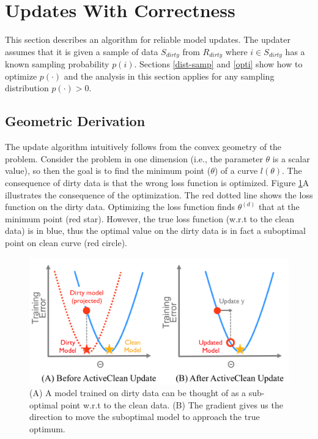 \section{Updates With Correctness}\label{model-update}
This section describes an algorithm for reliable model updates.
The updater assumes that it is given a sample of data $S_{dirty}$ from $R_{dirty}$ where $i \in S_{dirty}$ has a known sampling probability $p(i)$.
Sections \ref{dist-samp} and \ref{opti} show how to optimize $p(\cdot)$ and the analysis in this section applies for any sampling distribution $p(\cdot) > 0$.

\subsection{Geometric Derivation}\label{geod}
The update algorithm intuitively follows from the convex geometry of the problem.
Consider the problem in one dimension (i.e., the parameter $\theta$ is a scalar value), so then the goal is to find the minimum point ($\theta$) of a curve $l(\theta)$.
The consequence of dirty data is that the wrong loss function is optimized.
Figure \ref{update-arch2}A illustrates the consequence of the optimization.
The red dotted line shows the loss function on the dirty data.
Optimizing the loss function finds $\theta^{(d)}$ that at the minimum point (red star).
However, the true loss function (w.r.t to the clean data) is in blue, thus
the optimal value on the dirty data is in fact a suboptimal point on clean curve (red circle).

\begin{figure}[ht!]
\centering
 \includegraphics[width=\columnwidth]{figs/update-arch2.png}\vspace{-1em}
 \caption{(A) A model trained on dirty data can be thought of as a sub-optimal point w.r.t to the clean data. (B) The gradient gives us the direction to move the suboptimal model to approach the true optimum. \label{update-arch2}}\vspace{-1em}
\end{figure}

